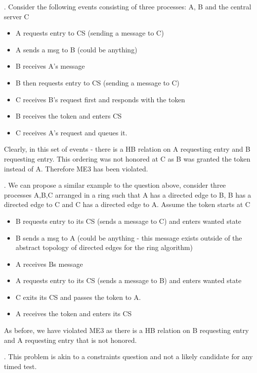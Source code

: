 \documentclass[12pt]{article}
\newcounter{question}
\newcommand{\question}[1]{
    \stepcounter{question}
    \thequestion. #1 \hfill
}
\begin{document}
\question{Consider the following events consisting of three processes: A, B and the central server C}


\begin{itemize}
    \item A requests entry to CS (sending a message to C)
    \item A sends a msg to B (could be anything)
    \item B receives A's message
    \item B then requests entry to CS (sending a message to C)
    \item C receives B's request first and responds with the token
    \item B receives the token and enters CS
    \item C receives A's request and queues it.
\end{itemize}

Clearly, in this set of events - there is a HB relation on A requesting entry and B requesting entry. This ordering was not honored at C as B was granted the token instead of A. Therefore ME3 has been violated.

\question{We can propose a similar example to the question above, consider three processes A,B,C arranged in a ring such that A has a directed edge to B, B has a directed edge to C and C has a directed edge to A. Assume the token starts at C}

\begin{itemize}
    \item B requests entry to its CS (sends a message to C) and enters wanted state
    \item B sends a msg to A (could be anything - this message exists outside of the abstract topology of directed edges for the ring algorithm)
    \item A receives Bs message
    \item A requests entry to its CS (sends a message to B) and enters wanted state
    \item C exits its CS and passes the token to A.
    \item A receives the token and enters its CS
\end{itemize}

As before, we have violated ME3 as there is a HB relation on B requesting entry and A requesting entry that is not honored.

\question{This problem is akin to a constraints question and not a likely candidate for any timed test.}
\end{document}
